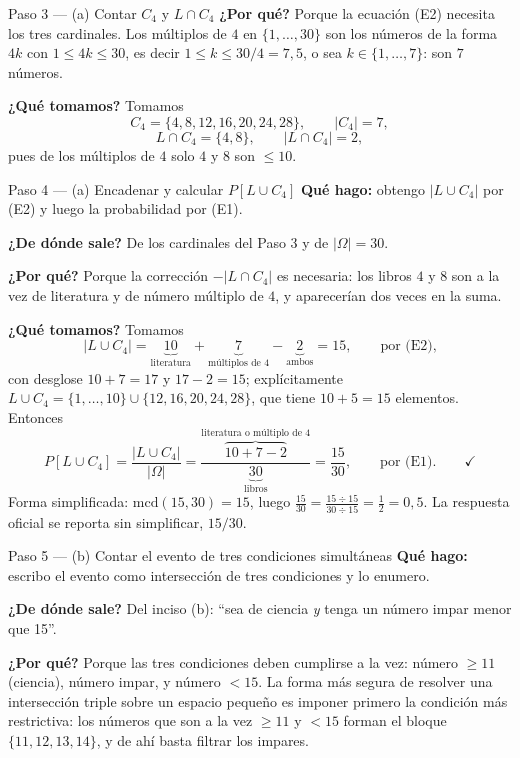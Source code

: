 \documentclass[11pt]{article}
\begin{document}
\begin{sol}
\begin{paso}{Paso 3 --- (a) Contar $C_4$ y $L\cap C_4$}
\textbf{¿Por qué?} Porque la ecuación (E2) necesita los tres cardinales. Los múltiplos de $4$ en
$\{1,\dots,30\}$ son los números de la forma $4k$ con $1\le 4k\le 30$, es decir
$1\le k\le 30/4=7{,}5$, o sea $k\in\{1,\dots,7\}$: son $7$ números.

\textbf{¿Qué tomamos?} Tomamos
\[
C_4=\{4,8,12,16,20,24,28\},\qquad |C_4|=7,
\]
\[
L\cap C_4=\{4,8\},\qquad |L\cap C_4|=2 ,
\]
pues de los múltiplos de $4$ solo $4$ y $8$ son $\le 10$.
\end{paso}

\begin{paso}{Paso 4 --- (a) Encadenar y calcular $P[L\cup C_4]$}
\textbf{Qué hago:} obtengo $|L\cup C_4|$ por (E2) y luego la probabilidad por (E1).

\textbf{¿De dónde sale?} De los cardinales del Paso 3 y de $|\Omega|=30$.

\textbf{¿Por qué?} Porque la corrección $-|L\cap C_4|$ es necesaria: los libros $4$ y $8$ son a
la vez de literatura y de número múltiplo de $4$, y aparecerían dos veces en la suma.

\textbf{¿Qué tomamos?} Tomamos
\[
|L\cup C_4|=\underbrace{10}_{\text{literatura}}+\underbrace{7}_{\text{múltiplos de }4}
-\underbrace{2}_{\text{ambos}}=15 , \qquad\text{por (E2),}
\]
con desglose $10+7=17$ y $17-2=15$; explícitamente
$L\cup C_4=\{1,\dots,10\}\cup\{12,16,20,24,28\}$, que tiene $10+5=15$ elementos. Entonces
\[
P[L\cup C_4]=\frac{|L\cup C_4|}{|\Omega|}
=\frac{\overbrace{10+7-2}^{\text{literatura o múltiplo de }4}}{\underbrace{30}_{\text{libros}}}
=\frac{15}{30} , \qquad\text{por (E1)} . \qquad\checkmark
\]
Forma simplificada: $\mathrm{mcd}(15,30)=15$, luego
$\frac{15}{30}=\frac{15\div 15}{30\div 15}=\frac{1}{2}=0{,}5$. La respuesta oficial se reporta
sin simplificar, $15/30$.
\end{paso}

\begin{paso}{Paso 5 --- (b) Contar el evento de tres condiciones simultáneas}
\textbf{Qué hago:} escribo el evento como intersección de tres condiciones y lo enumero.

\textbf{¿De dónde sale?} Del inciso (b): ``sea de ciencia \emph{y} tenga un número impar menor
que 15''.

\textbf{¿Por qué?} Porque las tres condiciones deben cumplirse a la vez: número $\ge 11$
(ciencia), número impar, y número $<15$. La forma más segura de resolver una intersección triple
sobre un espacio pequeño es imponer primero la condición más restrictiva: los números que son a
la vez $\ge 11$ y $<15$ forman el bloque $\{11,12,13,14\}$, y de ahí basta filtrar los impares.


\end{paso}
\end{sol}
\end{document}
